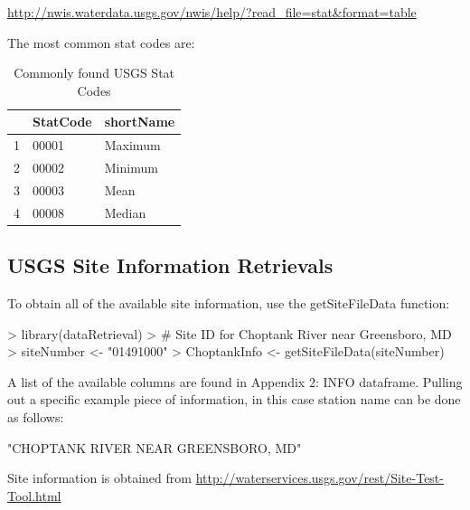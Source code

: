 \documentclass[a4paper,11pt]{article}
\begin{document}
\url{http://nwis.waterdata.usgs.gov/nwis/help/?read_file=stat&format=table}

The most common stat codes are:
\begin{table}[ht]
\begin{center}
\caption{Commonly found USGS Stat Codes}
\begin{tabular}{rll}
  \hline
 & StatCode & shortName \\ 
  \hline
1 & 00001 & Maximum \\ 
  2 & 00002 & Minimum \\ 
  3 & 00003 & Mean \\ 
  4 & 00008 & Median \\ 
   \hline
\end{tabular}
\end{center}
\end{table}

\subsection{USGS Site Information Retrievals}
To obtain all of the available site information, use the getSiteFileData function:
\begin{Schunk}
\begin{Sinput}
> library(dataRetrieval)
> # Site ID for Choptank River near Greensboro, MD
> siteNumber <- "01491000" 
> ChoptankInfo <- getSiteFileData(siteNumber)
\end{Sinput}
\end{Schunk}

A list of the available columns are found in Appendix 2: INFO dataframe. Pulling out a specific example piece of information, in this case station name can be done as follows:

\begin{Schunk}
\begin{Soutput}
[1] "CHOPTANK RIVER NEAR GREENSBORO, MD"
\end{Soutput}
\end{Schunk}
Site information is obtained from \url{http://waterservices.usgs.gov/rest/Site-Test-Tool.html}

\end{document}
